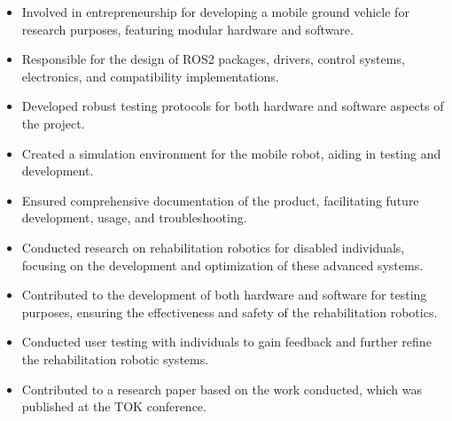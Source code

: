 \documentclass[10pt,a4paper,ragged2e,withhyper]{altacv}
\begin{document}


\makecvheader



\begin{paracol}{2}
\begin{itemize}
  \item Involved in entrepreneurship for developing a mobile ground vehicle for research purposes, featuring modular hardware and software.
  \item Responsible for the design of ROS2 packages, drivers, control systems, electronics, and compatibility implementations.
  \item Developed robust testing protocols for both hardware and software aspects of the project.
  \item Created a simulation environment for the mobile robot, aiding in testing and development.
  \item Ensured comprehensive documentation of the product, facilitating future development, usage, and troubleshooting.
\end{itemize}

\divider
{}
\begin{itemize}
  \item Conducted research on rehabilitation robotics for disabled individuals, focusing on the development and optimization of these advanced systems.
  \item Contributed to the development of both hardware and software for testing purposes, ensuring the effectiveness and safety of the rehabilitation robotics.
  \item Conducted user testing with individuals to gain feedback and further refine the rehabilitation robotic systems.
  \item Contributed to a research paper based on the work conducted, which was published at the TOK conference.
\end{itemize}


\end{paracol}
\end{document}
